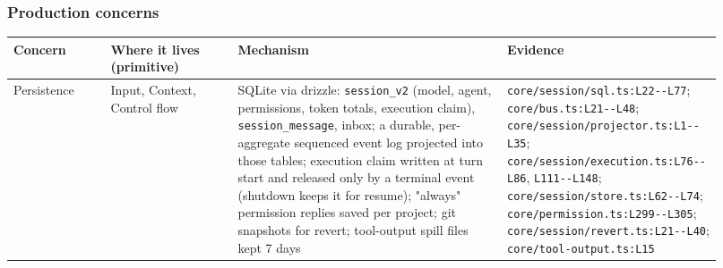 \subsubsection*{Production concerns}
\begin{longtable}{@{}p{0.13\linewidth}p{0.17\linewidth}p{0.36\linewidth}p{0.26\linewidth}@{}}
\toprule \textbf{Concern} & \textbf{Where it lives (primitive)} & \textbf{Mechanism} & \textbf{Evidence} \\ \midrule \endhead
Persistence & Input, Context, Control flow & SQLite via drizzle: \texttt{session\_\allowbreak{}v2} (model, agent, permissions, token totals, execution claim), \texttt{session\_\allowbreak{}message}, inbox; a durable, per-aggregate sequenced event log projected into those tables; execution claim written at turn start and released only by a terminal event (shutdown keeps it for resume); "always" permission replies saved per project; git snapshots for revert; tool-output spill files kept 7 days & \texttt{core/\allowbreak{}session/\allowbreak{}sql.\allowbreak{}ts:\allowbreak{}L22-\allowbreak{}-\allowbreak{}L77}; \texttt{core/\allowbreak{}bus.\allowbreak{}ts:\allowbreak{}L21-\allowbreak{}-\allowbreak{}L48}; \texttt{core/\allowbreak{}session/\allowbreak{}projector.\allowbreak{}ts:\allowbreak{}L1-\allowbreak{}-\allowbreak{}L35}; \texttt{core/\allowbreak{}session/\allowbreak{}execution.\allowbreak{}ts:\allowbreak{}L76-\allowbreak{}-\allowbreak{}L86}, \texttt{L111-\allowbreak{}-\allowbreak{}L148}; \texttt{core/\allowbreak{}session/\allowbreak{}store.\allowbreak{}ts:\allowbreak{}L62-\allowbreak{}-\allowbreak{}L74}; \texttt{core/\allowbreak{}permission.\allowbreak{}ts:\allowbreak{}L299-\allowbreak{}-\allowbreak{}L305}; \texttt{core/\allowbreak{}session/\allowbreak{}revert.\allowbreak{}ts:\allowbreak{}L21-\allowbreak{}-\allowbreak{}L40}; \texttt{core/\allowbreak{}tool-\allowbreak{}output.\allowbreak{}ts:\allowbreak{}L15} \\

\end{longtable}
